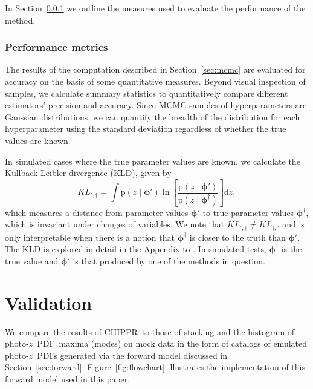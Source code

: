 \documentclass[iop]{emulateapj}
\newcommand{\Sect}[1]{Section~\ref{#1}}
\newcommand{\Fig}[1]{Figure~\ref{#1}}
\newcommand{\project}[1]{{\textsc{#1}}}
\newcommand{\Chippr}{\project{CHIPPR}}
\newcommand{\pr}[1]{\ensuremath{\mathrm{p}(#1)}}
\newcommand{\gvn}{\mid}%
\newcommand{\integral}[2]{\ensuremath{\int #1 \mathrm{d} #2}}
\newcommand{\pz}{photo-$z$~}
\newcommand{\pzpdf}{\pz PDF}
\newcommand{\bvec}[1]{\ensuremath{\boldsymbol{#1}}}
\newcommand{\ndphi}{\bvec{\phi}}
\begin{document}
In \Sect{sec:diag} we outline the measures used to evaluate the performance of the method.

\subsubsection{Performance metrics}
\label{sec:diag}

The results of the computation described in \Sect{sec:mcmc} are evaluated for accuracy on the basis of some quantitative measures.  
Beyond visual inspection of samples, we calculate summary statistics to quantitatively compare different estimators' precision and accuracy.  
Since MCMC samples of hyperparameters are Gaussian distributions, we can quantify the breadth of the distribution for each hyperparameter using the standard deviation regardless of whether the true values are known.  

In simulated cases where the true parameter values are known, we calculate the Kullback-Leibler divergence (KLD), given by 
\begin{equation}
\label{eqn:kl}
KL_{',\ddagger} = \integral{\pr{z \gvn \ndphi'} \ln \left[ \frac{\pr{z \gvn \ndphi'}}{\pr{z \gvn \ndphi^{\dagger}}} \right]}{z} ,
\end{equation}
which measures a distance from parameter values $\ndphi'$ to true parameter values $\ndphi^{\dagger}$, which is invariant under changes of variables.  
We note that $KL_{',\dagger} \neq KL_{\dagger,'}$ and is only interpretable when there is a notion that $\ndphi^{\dagger}$ is closer to the truth than $\ndphi'$.
The KLD is explored in detail in the Appendix to \citet{malz_approximating_2018}.
In simulated tests, $\ndphi^{\dagger}$ is the true value and $\ndphi'$ is that produced by one of the methods in question.

\section{Validation}
\label{sec:alldata}

We compare the results of \Chippr\ to those of stacking and the histogram of \pzpdf\ maxima (modes) on mock data in the form of catalogs of emulated \pzpdf s generated via the forward model discussed in \Sect{sec:forward}.
\Fig{fig:flowchart} illustrates the implementation of this forward model used in this paper.
\end{document}
